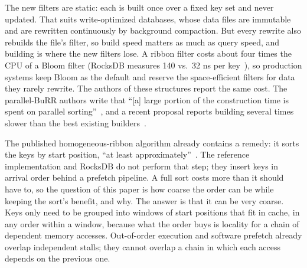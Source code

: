 \documentclass[a4paper,UKenglish,cleveref,autoref,thm-restate,anonymous]{lipics-v2021}
\begin{document}
The new filters are static: each is built once over a fixed key set and never updated. That suits write-optimized databases, whose data files are immutable and are rewritten continuously by background compaction. But every rewrite also rebuilds the file's filter, so build speed matters as much as query speed, and building is where the new filters lose. A ribbon filter costs about four times the CPU of a Bloom filter (RocksDB measures 140 vs.\ 32 ns per key~\cite{rocksdbribbonblog}), so production systems keep Bloom as the default and reserve the space-efficient filters for data they rarely rewrite. The authors of these structures report the same cost. The parallel-BuRR authors write that ``[a] large portion of the construction time is spent on parallel sorting''~\cite{becht2024parallelburr}, and a recent proposal reports building several times slower than the best existing builders~\cite{limasset2026zor}.

The published homogeneous-ribbon algorithm already contains a remedy: it sorts the keys by start position, ``at least approximately''~\cite{dietzfelbinger2026ribbon}. The reference implementation and RocksDB do not perform that step; they insert keys in arrival order behind a prefetch pipeline. A full sort costs more than it should have to, so the question of this paper is how coarse the order can be while keeping the sort's benefit, and why. The answer is that it can be very coarse. Keys only need to be grouped into windows of start positions that fit in cache, in any order within a window, because what the order buys is locality for a chain of dependent memory accesses. Out-of-order execution and software prefetch already overlap independent stalls; they cannot overlap a chain in which each access depends on the previous one.
\end{document}
